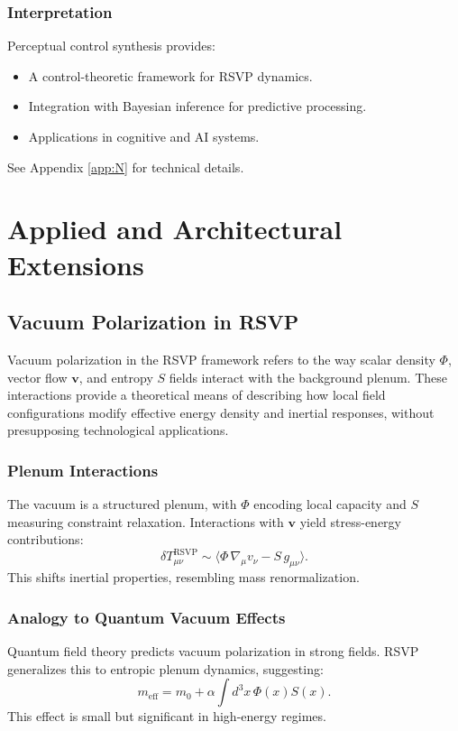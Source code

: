 \documentclass[12pt]{report}
\begin{document}
\section{Interpretation}
Perceptual control synthesis provides:
\begin{itemize}
    \item A control-theoretic framework for RSVP dynamics.
    \item Integration with Bayesian inference for predictive processing.
    \item Applications in cognitive and AI systems.
\end{itemize}
See Appendix \ref{app:N} for technical details.

\part{Applied and Architectural Extensions}

\chapter{Vacuum Polarization in RSVP}
\label{app:AA}
Vacuum polarization in the RSVP framework refers to the way scalar density \(\Phi\), vector flow \(\mathbf{v}\), and entropy \(S\) fields interact with the background plenum. These interactions provide a theoretical means of describing how local field configurations modify effective energy density and inertial responses, without presupposing technological applications.

\section{Plenum Interactions}
The vacuum is a structured plenum, with \(\Phi\) encoding local capacity and \(S\) measuring constraint relaxation. Interactions with \(\mathbf{v}\) yield stress-energy contributions:
\begin{equation}
\delta T_{\mu\nu}^{\text{RSVP}} \sim \langle \Phi \, \nabla_\mu v_\nu - S \, g_{\mu\nu} \rangle.
\end{equation}
This shifts inertial properties, resembling mass renormalization.

\section{Analogy to Quantum Vacuum Effects}
Quantum field theory predicts vacuum polarization in strong fields. RSVP generalizes this to entropic plenum dynamics, suggesting:
\begin{equation}
m_{\text{eff}} = m_0 + \alpha \int d^3x \, \Phi(x) S(x).
\end{equation}
This effect is small but significant in high-energy regimes.
\end{document}
